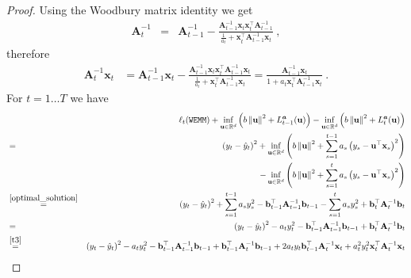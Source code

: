 \begin{proof}
Using the Woodbury matrix identity we get
\begin{eqnarray}
\mathbf{A}_{t}^{-1} & = & \mathbf{A}_{t-1}^{-1}-\frac{\mathbf{A}_{t-1}^{-1}\mathbf{x}_{t}\mathbf{x}_{t}^{\top}\mathbf{A}_{t-1}^{-1}}{\frac{1}{a_{t}}+\mathbf{x}_{t}^{\top}\mathbf{A}_{t-1}^{-1}\mathbf{x}_{t}}\label{woodbury}~,
\end{eqnarray}
therefore
\begin{align}
\mathbf{A}_{t}^{-1}\mathbf{x}_{t}
& =  \mathbf{A}_{t-1}^{-1}\mathbf{x}_{t}-\frac{\mathbf{A}_{t-1}^{-1}\mathbf{x}_{t}\mathbf{x}_{t}^{\top}\mathbf{A}_{t-1}^{-1}\mathbf{x}_{t}}{\frac{1}{a_{t}}+\mathbf{x}_{t}^{\top}\mathbf{A}_{t-1}^{-1}\mathbf{x}_{t}}%
  =  \frac{\mathbf{A}_{t-1}^{-1}\mathbf{x}_{t}}{1+a_{t}\mathbf{x}_{t}^{\top}\mathbf{A}_{t-1}^{-1}\mathbf{x}_{t}}\label{t4}~.
\end{align}
For $t = 1 \dots T$ we have
\begin{eqnarray*}
 &  & \ell_{t}(\texttt{WEMM})+\inf_{\mathbf{u}\in\mathbb{R}^{d}}\left(b\left\Vert \mathbf{u}\right\Vert ^{2}+L_{t-1}^{\boldsymbol{a}}(\mathbf{u})\right)-\inf_{\mathbf{u}\in\mathbb{R}^{d}}\left(b\left\Vert \mathbf{u}\right\Vert ^{2}+L_{t}^{\boldsymbol{a}}(\mathbf{u})\right)\\
 & = &
 \left(y_{t}-\hat{y}_{t}\right)^{2}+\inf_{\mathbf{u}\in\mathbb{R}^{d}}\left(b\left\Vert
     \mathbf{u}\right\Vert
   ^{2}+\sum_{s=1}^{t-1}a_{s}\left(y_{s}-\mathbf{u}^{\top}\mathbf{x}_{s}\right)^{2}\right)\\
   &&-\inf_{\mathbf{u}\in\mathbb{R}^{d}}\left(b\left\Vert
     \mathbf{u}\right\Vert
   ^{2}+\sum_{s=1}^{t}a_{s}\left(y_{s}-\mathbf{u}^{\top}\mathbf{x}_{s}\right)^{2}\right)\\
%
 & \overset{\eqref{optimal_solution}}{=} & \left(y_{t}-\hat{y}_{t}\right)^{2}+\sum_{s=1}^{t-1}a_{s}y_{s}^{2}-\mathbf{b}_{t-1}^{\top}\mathbf{A}_{t-1}^{-1}\mathbf{b}_{t-1}-\sum_{s=1}^{t}a_{s}y_{s}^{2}+\mathbf{b}_{t}^{\top}\mathbf{A}_{t}^{-1}\mathbf{b}_{t}\\
 & = & \left(y_{t}-\hat{y}_{t}\right)^{2}-a_{t}y_{t}^{2}-\mathbf{b}_{t-1}^{\top}\mathbf{A}_{t-1}^{-1}\mathbf{b}_{t-1}+\mathbf{b}_{t}^{\top}\mathbf{A}_{t}^{-1}\mathbf{b}_{t}\\
 &\overset{\eqref{t3}}{=}  & \left(y_{t}-\hat{y}_{t}\right)^{2}-a_{t}y_{t}^{2}-\mathbf{b}_{t-1}^{\top}\mathbf{A}_{t-1}^{-1}\mathbf{b}_{t-1}+\mathbf{b}_{t-1}^{\top}\mathbf{A}_{t}^{-1}\mathbf{b}_{t-1}+2a_{t}y_{t}\mathbf{b}_{t-1}^{\top}\mathbf{A}_{t}^{-1}\mathbf{x}_{t}+a_{t}^{2}y_{t}^{2}\mathbf{x}_{t}^{\top}\mathbf{A}_{t}^{-1}\mathbf{x}_{t}\\

\end{eqnarray*}
\end{proof}
